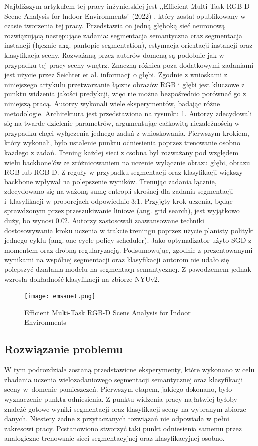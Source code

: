 Najbliższym artykułem tej pracy inżynierskiej jest ,,Efficient Multi-Task RGB-D Scene Analysis for Indoor Environments'' (2022) \cite{9892852}, który został opublikowany w czasie tworzenia tej pracy. Przedstawia on jedną głęboką sieć neuronową rozwiązującą następujące zadania: segmentacja semantyczna oraz segmentacja instancji (łącznie ang. pantopic segmentation), estymacja orientacji instancji oraz klasyfikacja sceny. Rozważaną przez autorów domeną są podobnie jak w przypadku tej pracy sceny wnętrz. Znaczną różnica poza dodatkowymi zadaniami jest użycie przez Seichter et al. informacji o głębi. Zgodnie z wnioskami z niniejszego artykułu przetwarzanie łączne obrazów RGB i głębi jest kluczowe z punktu widzenia jakości predykcji, więc nie można bezpośrednio porównać go z niniejszą pracą. Autorzy wykonali wiele eksperymentów, badając różne metodologie. Architektura jest przedstawiona na rysunku \ref{fig:emsanet}. Autorzy zdecydowali się na twarde dzielenie parametrów, argumentując całkowitą niezależnością w przypadku chęci wyłączenia jednego zadań z wnioskowania. Pierwszym krokiem, który wykonali, było ustalenie punktu odniesienia poprzez trenowanie osobno każdego z zadań. Trening każdej sieci z osobna był rozważany pod względem wielu backbone'ów ze zróżnicowaniem na uczenie wyłącznie obrazu głębi, obrazu RGB lub RGB-D. Z reguły w przypadku segmentacji oraz klasyfikacji większy backbone wpływał na polepszenie wyników. Trenując zadania łącznie, zdecydowano się na ważoną sumę entropii skrośnej dla zadania segmentacji i~klasyfikacji w proporcjach odpowiednio 3:1. Przyjęty krok uczenia, będąc sprawdzonym przez przeszukiwanie liniowe (ang. grid search), jest wyjątkowo duży, bo wynosi 0.02. Autorzy zastosowali zaawansowane techniki dostosowywania kroku uczenia w trakcie treningu poprzez użycie planisty polityki jednego cyklu (ang. one cycle policy scheduler). Jako optymalizator użyto SGD z momentem oraz drobną regularyzacją. Podsumowując, zgodnie z prezentowanymi wynikami na wspólnej segmentacji oraz klasyfikacji autorom nie udało się polepszyć działania modelu na segmentacji semantycznej. Z powodzeniem jednak wzrosła dokładność klasyfikacji na zbiorze NYUv2.

\begin{figure}[ht!]
    \centering
    \texttt{[image: emsanet.png]}
    \caption{Efficient Multi-Task RGB-D Scene Analysis for Indoor Environments \cite{9892852}}
    \label{fig:emsanet}
\end{figure}


\subsection{Rozwiązanie problemu}
W tym podrozdziale zostaną przedstawione eksperymenty, które wykonano w celu zbadania uczenia wielozadaniowego segmentacji semantycznej oraz klasyfikacji sceny w~domenie pomieszczeń. Pierwszym etapem, jakiego dokonano, było wyznaczenie punktu odniesienia. Z punktu widzenia pracy najłatwiej byłoby znaleźć gotowe wyniki segmentacji oraz klasyfikacji sceny na wybranym zbiorze danych. Niestety żadne z przytaczanych rozwiązań nie odpowiada w pełni zakresowi pracy. Postanowiono stworzyć taki punkt odniesienia samemu przez analogiczne trenowanie sieci segmentacyjnej oraz klasyfikacyjnej osobno.

